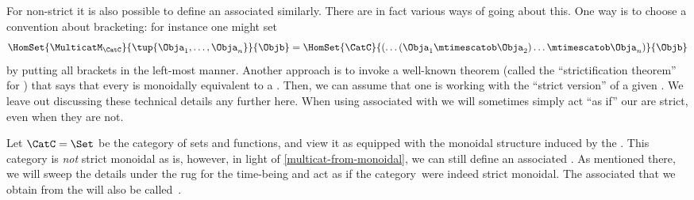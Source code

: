 



\begin{remark}
    \label{multicat-from-monoidal}
    For non-strict  it is also possible to define an associated  similarly.
    There are in fact various ways of going about this.
    One way is to choose a convention about bracketing: for instance one might set
    \begin{equation}
        \HomSet{\MulticatM_\CatC}{\tup{\Obja_1,\ldots,\Obja_n}}{\Objb}=\HomSet{\CatC}{ ( \dots (\Obja_1 \mtimescatob \Obja_2) \ldots \mtimescatob \Obja_n)}{\Objb}
    \end{equation}
    by putting all brackets in the left-most manner.
    Another approach is to invoke a well-known theorem (called the ``strictification theorem'' for ) that says that every  is monoidally equivalent to a .
    Then, we can assume that one is working with the ``strict version'' of a given .
    We leave out discussing these technical details any further here.
    When using  associated with  we will sometimes simply act ``as if'' our  are strict, even when they are not.
\end{remark}

\begin{example}
    Let $\CatC = \Set$ be the category of sets and functions, and view it as equipped with the monoidal structure induced by the .
    This category is \emph{not} strict monoidal as is, however, in light of \cref{multicat-from-monoidal}, we can still define an associated .
    As mentioned there, we will sweep the details under the rug for the time-being and act as if the category~\Set were indeed strict monoidal.
    The associated  that we obtain from the  \Set will also be called~\Set.
\end{example}

